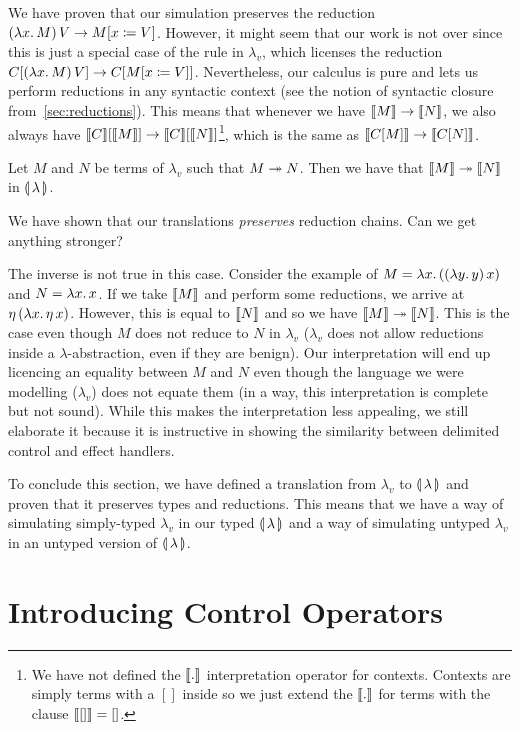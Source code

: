 We have proven that our simulation preserves the reduction
$(\lambda x.\, M)\,V \to M[x \coloneqq V]$. However, it might seem that our
work is not over since this is just a special case of the rule in
$\lambda_v$, which licenses the reduction $C[(\lambda x.\, M)\,V] \to
C[M[x \coloneqq V]]$. Nevertheless, our calculus is pure and lets us perform
reductions in any syntactic context (see the notion of syntactic closure
from~\ref{sec:reductions}). This means that whenever we have $\llbracket M \rrbracket \to
\llbracket N \rrbracket$, we also always have $\llbracket C \rrbracket[\llbracket M \rrbracket] \to
\llbracket C \rrbracket[\llbracket N \rrbracket]$\footnote{We have not defined the $\llbracket . \rrbracket$ interpretation
  operator for contexts. Contexts are simply terms with a $[]$ inside so we
  just extend the $\llbracket . \rrbracket$ for terms with the clause $\llbracket [] \rrbracket = []$.},
which is the same as $\llbracket C[M] \rrbracket \to \llbracket C[N] \rrbracket$.

\begin{corollary}
  Let $M$ and $N$ be terms of $\lambda_v$ such that $M \twoheadrightarrow N$. Then we
  have that $\llbracket M \rrbracket \twoheadrightarrow \llbracket N \rrbracket$ in $\llparenthesis \, \lambda \, \rrparenthesis$.
\end{corollary}

We have shown that our translations \emph{preserves} reduction chains. Can
we get anything stronger?

The inverse is not true in this case. Consider the example of $M =
\lambda x.\, ((\lambda y.\, y)\,x)$ and $N = \lambda x.\, x$. If we take $\llbracket M \rrbracket$
and perform some reductions, we arrive at
$\eta\,(\lambda x.\, \eta\,x)$. However, this is equal to $\llbracket N \rrbracket$
and so we have $\llbracket M \rrbracket \twoheadrightarrow \llbracket N \rrbracket$. This is the case even though $M$
does not reduce to $N$ in $\lambda_v$ ($\lambda_v$ does not allow
reductions inside a $\lambda$-abstraction, even if they are benign). Our
interpretation will end up licencing an equality between $M$ and $N$ even
though the language we were modelling ($\lambda_v$) does not equate them
(in a way, this interpretation is complete but not sound). While this makes
the interpretation less appealing, we still elaborate it because it is
instructive in showing the similarity between delimited control and effect
handlers.

To conclude this section, we have defined a translation from $\lambda_v$
to $\llparenthesis \, \lambda \, \rrparenthesis$ and proven that it preserves types and
reductions. This means that we have a way of simulating simply-typed
$\lambda_v$ in our typed $\llparenthesis \, \lambda \, \rrparenthesis$ and a way of simulating untyped
$\lambda_v$ in an untyped version of $\llparenthesis \, \lambda \, \rrparenthesis$.

\section{Introducing Control Operators}

